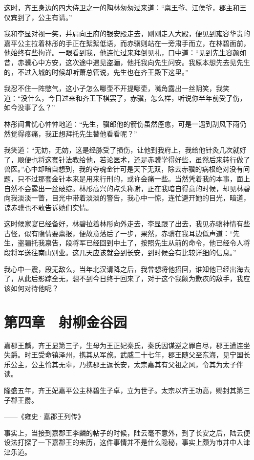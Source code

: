 这时，齐王身边的四大侍卫之一的陶林匆匆过来道：“禀王爷、江侯爷，郡主和王仪宾到了，公主有请。”

我和李显对视一笑，并肩向王府的银安殿走去，刚刚走入大殿，便见到雍容华贵的嘉平公主拉着林彤的手正在絮絮低语，而赤骥则站在一旁肃手而立，在林碧面前，他始终有些拘谨。一眼看到我，他连忙过来拜倒见礼，口中道：“见到先生容颜如昔，赤骥心中方安，这次途中遇见盗骊，他托我向先生问安。我原本想先去见先生的，不过入城的时候却听萧总管说，先生也在齐王殿下这里。”

我忍不住一阵憋气，这小子怎么哪壶不开提哪壶，嘴角露出一丝阴笑，我笑道：“没什么，今日过来和齐王下棋罢了，赤骥，怎么样，听说你半年前受了伤，如今没事了么？”

林彤闻言忧心忡忡地道：“先生，骥郎他的箭伤虽然痊愈，可是一遇到刮风下雨仍然觉得疼痛，我正想拜托先生替他看看呢？”

我笑道：“无妨，无妨，这是经脉受了损伤，让他到我府上，我给他针灸几次就好了，顺便也将这套针法教给他，若论医术，还是赤骥学得好些，虽然后来转行做了兽医。”心中却暗自想到，我的夺魂金针可是天下无双，除去赤骥的病根绝对没有问题，只不过那套金针本来是用来行刑的，或许会痛一些。当然凭着我的本事，面上自然不会露出一丝破绽。林彤高兴的点头称谢，正在我暗自得意的时候，却见林碧向我淡淡一瞥，目光中带着淡淡的警告，我心中一惊，连忙避开她的目光，暗道，谅赤骥也不敢告诉她们实情。

这时候家宴已经备好，林碧拉着林彤向外走去，李显跟了出去，我见赤骥神情有些古怪，似有隐情要禀报，便故意落后了一步，果然，赤骥在我耳边低声道：“先生，盗骊托我禀告，段将军已经回到中土了，按照先生从前的命令，他已经令人将段将军送往南山别业。这几天应该就会到长安，到时候会有比较详细的信息。”

我心中一震，段无敌么，当年北汉请降之后，我曾想将他招回，谁知他已经出海去了，从此后影踪全无，想不到今日终于回来了，对于这个我颇为歉疚的敌手，我应该如何对待他呢？

\chapter{第四章　射柳金谷园}

嘉郡王麟，齐王显第三子，生母为王正妃秦氏，秦氏因谋逆之罪自尽，郡王遭连坐失爵。时王受命镇泽州，携其从军旅。武威二十七年，郡王随父至东海，见宁国长乐公主，公主怜其无辜，乃携郡王返长安，太宗嘉其有父祖之风，令其为太子伴读。

隆盛五年，齐王妃嘉平公主林碧生子卓，立为世子。太宗以齐王功高，赐封其第三子郡王爵。

——《雍史·嘉郡王列传》

事实上，当接到嘉郡王李麟的帖子的时候，陆云毫不意外，到了长安之后，陆云便设法打探了一下嘉郡王的来历，这件事情并不是什么隐秘，事实上颇为市井中人津津乐道。

